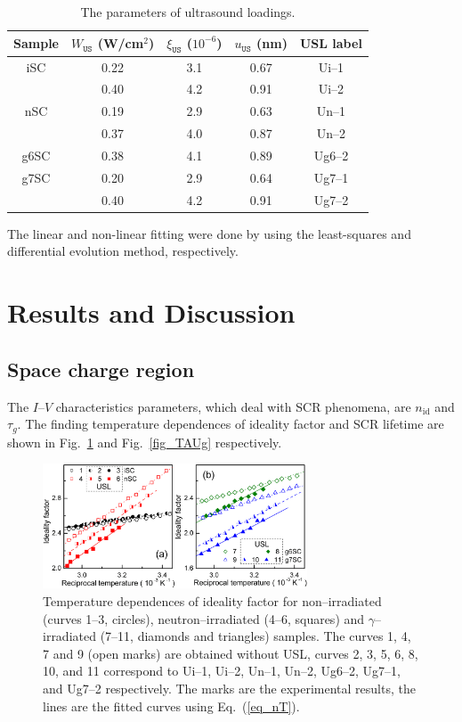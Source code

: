 \documentclass[aip,jap, amsmath,amssymb,reprint]{revtex4-1}
\begin{document}
\begin{table}
\caption{\label{tabUSL}The parameters of ultrasound loadings.
}
\begin{ruledtabular}
\begin{tabular}{ccccc}
Sample&$W_{\mathtt{US}}$ (W/cm$^2$)&$\xi_{\mathtt{US}}$ ($10^{-6}$)&$u_{\mathtt{US}}$ (nm)&USL label\\
\hline
iSC&0.22&3.1&0.67&Ui--1\\
&0.40&4.2&0.91&Ui--2\\
nSC&0.19&2.9&0.63&Un--1\\
&0.37&4.0&0.87&Un--2\\
g6SC&0.38&4.1&0.89&Ug6--2\\
g7SC&0.20&2.9&0.64&Ug7--1\\
&0.40&4.2&0.91&Ug7--2\\
\end{tabular}
\end{ruledtabular}
\end{table}


The linear and non-linear fitting were done by using the least-squares and differential evolution \cite{DEWang} method, respectively.


\section{Results and Discussion}
\subsection{Space charge region\label{SCR}}
The $I$--$V$ characteristics parameters, which deal with SCR phenomena, are $n_{\mathrm{id}}$ and $\tau_{g}$.
The finding temperature dependences of ideality factor and SCR lifetime are shown in Fig.~\ref{fig_n} and Fig.~\ref{fig_TAUg} respectively.

\begin{figure}
\includegraphics[width=0.7\textwidth]{olikhFig2}%
\caption{\label{fig_n}
Temperature dependences of ideality factor for non--irradiated (curves 1--3, circles),
neutron--irradiated (4--6, squares) and $\gamma$--irradiated (7--11, diamonds and triangles) samples.
The curves 1, 4, 7 and 9 (open marks) are obtained without USL,
curves 2, 3, 5, 6, 8, 10, and 11 correspond to
Ui--1, Ui--2, Un--1, Un--2, Ug6--2, Ug7--1, and Ug7--2 respectively.
The marks are the experimental results, the lines are the fitted curves using Eq.~(\ref{eq_nT}).
}%
\end{figure}
\end{document}
